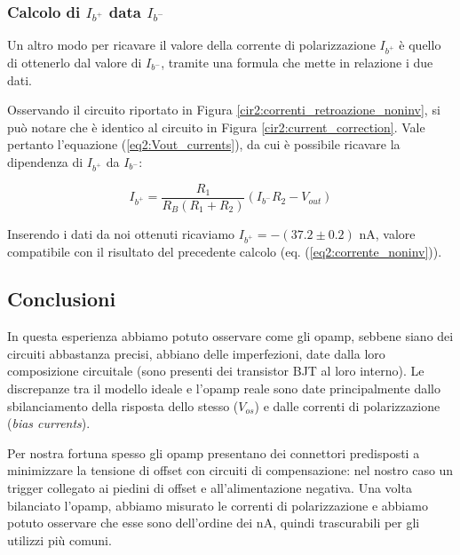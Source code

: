 \subsubsection*{Calcolo di $I_{b^+}$ data $I_{b^-}$}

Un altro modo per ricavare il valore della corrente di polarizzazione $I_{b^+}$ è quello di ottenerlo dal valore di $I_{b^-}$, tramite una formula che mette in relazione i due dati.

Osservando il circuito riportato in Figura \ref{cir2:correnti_retroazione_noninv}, si può notare che è identico al circuito in Figura \ref{cir2:current_correction}.
Vale pertanto l'equazione (\ref{eq2:Vout_currents}), da cui è possibile ricavare la dipendenza di $I_{b^+}$ da $I_{b^-}$:

$$I_{b^+} = \frac{R_1}{R_B(R_1+R_2)}(I_{b^-} R_2-V_{out})$$

Inserendo i dati da noi ottenuti ricaviamo $I_{b^+} = - (37.2 \pm 0.2)$ \si{\nano\ampere}, valore compatibile con il risultato del precedente calcolo (eq. (\ref{eq2:corrente_noninv})).

\subsection{Conclusioni}
In questa esperienza abbiamo potuto osservare come gli opamp, sebbene siano dei circuiti abbastanza precisi, abbiano delle imperfezioni, date dalla loro composizione circuitale (sono presenti dei transistor BJT al loro interno).
Le discrepanze tra il modello ideale e l'opamp reale sono date principalmente dallo sbilanciamento della risposta dello stesso ($V_{os}$) e dalle correnti di polarizzazione (\textit{bias currents}).

Per nostra fortuna spesso gli opamp presentano dei connettori predisposti a minimizzare la tensione di offset con circuiti di compensazione: nel nostro caso un trigger collegato ai piedini di offset e all'alimentazione negativa.
Una volta bilanciato l'opamp, abbiamo misurato le correnti di polarizzazione e abbiamo potuto osservare che esse sono dell'ordine dei \si{\nano\ampere}, quindi trascurabili per gli utilizzi più comuni.

